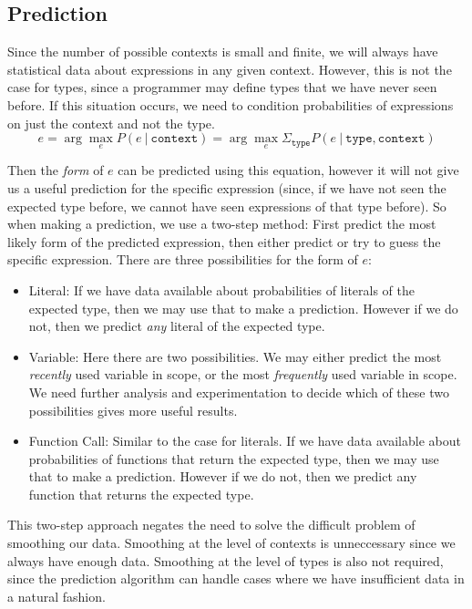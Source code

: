 \documentclass{article} %
\begin{document}
\subsection*{Prediction}

Since the number of possible contexts is small and finite, we will always have statistical data about expressions in any given context. However, this is not the case for types, since a programmer may define types that we have never seen before. If this situation occurs, we need to condition probabilities of expressions on just the context and not the type. 
$$ e = \arg\max_e P(e ~|~ \texttt{context} ) = \arg\max_e \Sigma_{\texttt{type}} P(e ~|~ \texttt{type} , \texttt{context} ) $$

Then the \emph{form} of $e$ can be predicted using this equation, however it will not give us a useful prediction for the specific expression (since, if we have not seen the expected type before, we cannot have seen expressions of that type before). So when making a prediction, we use a two-step method: First predict the most likely form of the predicted expression, then either predict or try to guess the specific expression. There are three possibilities for the form of $e$:
\begin{itemize}
  \item Literal: If we have data available about probabilities of literals of the expected type, then we may use that to make a prediction. However if we do not, then we predict \emph{any} literal of the expected type.
  \item Variable: Here there are two possibilities. We may either predict the most \emph{recently} used variable in scope, or the most \emph{frequently} used variable in scope. We need further analysis and experimentation to decide which of these two possibilities gives more useful results.
  \item Function Call: Similar to the case for literals. If we have data available about probabilities of functions that return the expected type, then we may use that to make a prediction. However if we do not, then we predict any function that returns the expected type.
\end{itemize}

This two-step approach negates the need to solve the difficult problem of smoothing our data. Smoothing at the level of contexts is unneccessary since we always have enough data. Smoothing at the level of types is also not required, since the prediction algorithm can handle cases where we have insufficient data in a natural fashion.
\end{document}
